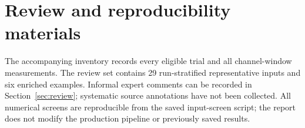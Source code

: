 \documentclass[11pt,a4paper]{article}
\begin{document}
\section{Review and reproducibility materials}
The accompanying inventory records every eligible trial and all channel-window measurements. The review set contains 29 run-stratified representative inputs and six enriched examples. Informal expert comments can be recorded in Section~\ref{sec:review}; systematic source annotations have not been collected. All numerical screens are reproducible from the saved input-screen script; the report does not modify the production pipeline or previously saved results.
\end{document}
